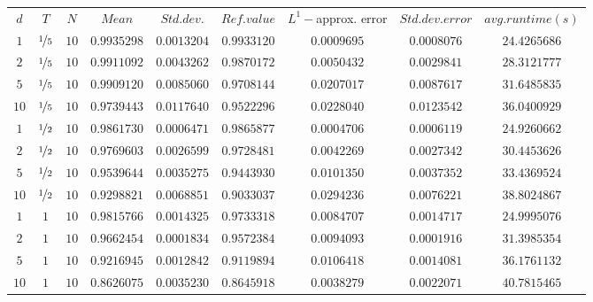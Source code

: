 \begin{tabular}{ccccccccc}
$d$ & $T$ & $N$ & $Mean$ & $Std. dev.$ & $Ref. value$ & $L^1-$approx. error & $Std. dev. error$ & $avg. runtime (s)$\\
$1$ & $\nicefrac{1}{5}$ & $10$ & $0.9935298$ & $0.0013204$ & $0.9933120$ & $0.0009695$ & $0.0008076$ & $24.4265686$\\
$2$ & $\nicefrac{1}{5}$ & $10$ & $0.9911092$ & $0.0043262$ & $0.9870172$ & $0.0050432$ & $0.0029841$ & $28.3121777$\\
$5$ & $\nicefrac{1}{5}$ & $10$ & $0.9909120$ & $0.0085060$ & $0.9708144$ & $0.0207017$ & $0.0087617$ & $31.6485835$\\
$10$ & $\nicefrac{1}{5}$ & $10$ & $0.9739443$ & $0.0117640$ & $0.9522296$ & $0.0228040$ & $0.0123542$ & $36.0400929$\\
$1$ & $\nicefrac{1}{2}$ & $10$ & $0.9861730$ & $0.0006471$ & $0.9865877$ & $0.0004706$ & $0.0006119$ & $24.9260662$\\
$2$ & $\nicefrac{1}{2}$ & $10$ & $0.9769603$ & $0.0026599$ & $0.9728481$ & $0.0042269$ & $0.0027342$ & $30.4453626$\\
$5$ & $\nicefrac{1}{2}$ & $10$ & $0.9539644$ & $0.0035275$ & $0.9443930$ & $0.0101350$ & $0.0037352$ & $33.4369524$\\
$10$ & $\nicefrac{1}{2}$ & $10$ & $0.9298821$ & $0.0068851$ & $0.9033037$ & $0.0294236$ & $0.0076221$ & $38.8024867$\\
$1$ & $1$ & $10$ & $0.9815766$ & $0.0014325$ & $0.9733318$ & $0.0084707$ & $0.0014717$ & $24.9995076$\\
$2$ & $1$ & $10$ & $0.9662454$ & $0.0001834$ & $0.9572384$ & $0.0094093$ & $0.0001916$ & $31.3985354$\\
$5$ & $1$ & $10$ & $0.9216945$ & $0.0012842$ & $0.9119894$ & $0.0106418$ & $0.0014081$ & $36.1761132$\\
$10$ & $1$ & $10$ & $0.8626075$ & $0.0035230$ & $0.8645918$ & $0.0038279$ & $0.0022071$ & $40.7815465$\\
\end{tabular}
